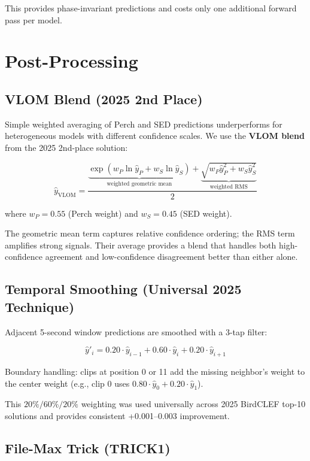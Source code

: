 \documentclass[11pt,a4paper]{article}
\begin{document}
This provides phase-invariant predictions and costs only one additional forward pass
per model.

\section{Post-Processing}
\label{sec:postproc}

\subsection{VLOM Blend (2025 2nd Place)}

Simple weighted averaging of Perch and SED predictions underperforms for heterogeneous
models with different confidence scales. We use the \textbf{VLOM blend} from the 2025
2nd-place solution:

\[
\hat{y}_{\text{VLOM}} = \frac{
  \underbrace{\exp(w_P \ln \hat{y}_P + w_S \ln \hat{y}_S)}_{\text{weighted geometric mean}}
  +
  \underbrace{\sqrt{w_P \hat{y}_P^2 + w_S \hat{y}_S^2}}_{\text{weighted RMS}}
}{2}
\]

where $w_P = 0.55$ (Perch weight) and $w_S = 0.45$ (SED weight).

The geometric mean term captures relative confidence ordering; the RMS term amplifies
strong signals. Their average provides a blend that handles both high-confidence
agreement and low-confidence disagreement better than either alone.

\subsection{Temporal Smoothing (Universal 2025 Technique)}

Adjacent 5-second window predictions are smoothed with a 3-tap filter:

\[
\hat{y}'_i = 0.20 \cdot \hat{y}_{i-1} + 0.60 \cdot \hat{y}_i + 0.20 \cdot \hat{y}_{i+1}
\]

Boundary handling: clips at position 0 or 11 add the missing neighbor's weight to
the center weight (e.g., clip 0 uses $0.80 \cdot \hat{y}_0 + 0.20 \cdot \hat{y}_1$).

This $20\%/60\%/20\%$ weighting was used universally across 2025 BirdCLEF top-10
solutions and provides consistent +0.001--0.003 improvement.

\subsection{File-Max Trick (TRICK1)}
\end{document}
